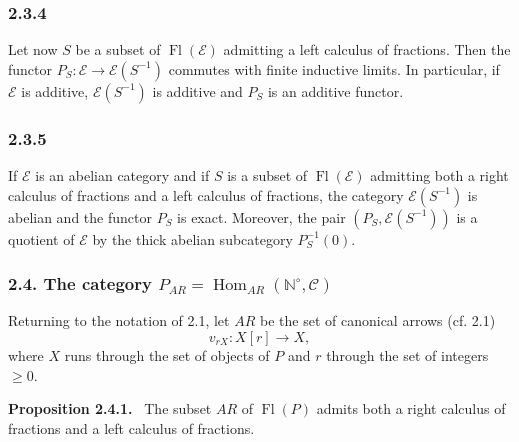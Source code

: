 \documentclass[11pt]{article}
\providecommand{\NN}{\mathbb{N}}
\newenvironment{statement}[1]{\par\medskip\noindent\textbf{#1.}\ }{\par\medskip}
\DeclareMathOperator{\Hom}{Hom}
\providecommand{\Hom}{\operatorname{Hom}}
\providecommand{\Fl}{\operatorname{Fl}}
\providecommand{\NN}{\mathbb N}
\providecommand{\cC}{\mathcal C}
\providecommand{\cE}{\mathcal E}
\providecommand{\cC}{\mathcal C}
\begin{document}
\subsubsection*{2.3.4}
Let now $S$ be a subset of $\Fl(\cE)$ admitting a left calculus of fractions. Then the functor $P_S:\cE\to\cE(S^{-1})$ commutes with finite inductive limits. In particular, if $\cE$ is additive, $\cE(S^{-1})$ is additive and $P_S$ is an additive functor.

\subsubsection*{2.3.5}
If $\cE$ is an abelian category and if $S$ is a subset of $\Fl(\cE)$ admitting both a right calculus of fractions and a left calculus of fractions, the category $\cE(S^{-1})$ is abelian and the functor $P_S$ is exact. Moreover, the pair $(P_S,\cE(S^{-1}))$ is a quotient of $\cE$ by the thick abelian subcategory $P_S^{-1}(0)$.

\subsubsection*{2.4. The category $P_{AR}=\Hom_{AR}(\NN^\circ,\cC)$}
Returning to the notation of 2.1, let $AR$ be the set of canonical arrows (cf. 2.1)
\[
v_{rX}:X[r]\longrightarrow X,
\]
where $X$ runs through the set of objects of $P$ and $r$ through the set of integers $\ge0$.

\begin{statement}{Proposition 2.4.1}
The subset $AR$ of $\Fl(P)$ admits both a right calculus of fractions and a left calculus of fractions.
\end{statement}
\end{document}
